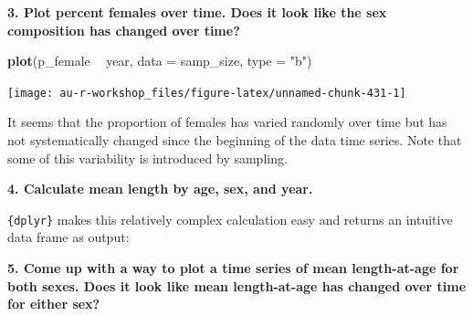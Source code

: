 \documentclass[]{book}
\newenvironment{Shaded}{\begin{snugshade}}{\end{snugshade}}
\newcommand{\KeywordTok}[1]{\textcolor[rgb]{0.13,0.29,0.53}{\textbf{#1}}}
\newcommand{\DataTypeTok}[1]{\textcolor[rgb]{0.13,0.29,0.53}{#1}}
\newcommand{\StringTok}[1]{\textcolor[rgb]{0.31,0.60,0.02}{#1}}
\newcommand{\OperatorTok}[1]{\textcolor[rgb]{0.81,0.36,0.00}{\textbf{#1}}}
\newcommand{\NormalTok}[1]{#1}
\theoremstyle{definition}
\theoremstyle{definition}
\theoremstyle{definition}
\theoremstyle{remark}
\begin{document}
\textbf{3. Plot percent females over time. Does it look like the sex
composition has changed over time?}

\begin{Shaded}
\begin{Highlighting}[]
\KeywordTok{plot}\NormalTok{(p_female }\OperatorTok{~}\StringTok{ }\NormalTok{year, }\DataTypeTok{data =}\NormalTok{ samp_size, }\DataTypeTok{type =} \StringTok{"b"}\NormalTok{)}
\end{Highlighting}
\end{Shaded}

\begin{center}\texttt{[image: au-r-workshop\_files/figure-latex/unnamed-chunk-431-1]} \end{center}

It seems that the proportion of females has varied randomly over time
but has not systematically changed since the beginning of the data time
series. Note that some of this variability is introduced by sampling.

\textbf{4. Calculate mean length by age, sex, and year.}

\texttt{\{dplyr\}} makes this relatively complex calculation easy and
returns an intuitive data frame as output:

\begin{Shaded}
\end{Shaded}

\textbf{5. Come up with a way to plot a time series of mean
length-at-age for both sexes. Does it look like mean length-at-age has
changed over time for either sex?}
\end{document}
